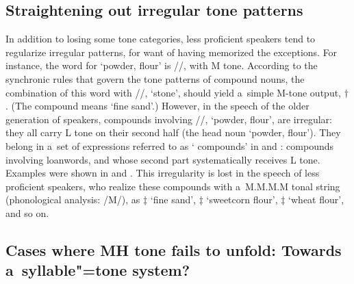 \subsection{Straightening out irregular tone patterns}
\label{sec:thestraighteningoutofirregulartonepatterns}

In addition to losing some tone categories, less proficient speakers tend to regularize irregular
patterns, for want of having memorized the exceptions. For instance, the word for ‘powder, flour’ is
//, with M tone. According to the synchronic rules that govern the tone patterns of compound nouns,
the combination of this word with //, ‘stone’, should yield a~simple M-tone output,
$\dagger$. (The compound means ‘fine sand’.) However, in the speech of the older generation of
speakers, compounds involving //,
‘powder, flour’, are irregular: they all carry L tone on their second half (the head noun ‘powder, flour’). They belong in a~set of expressions referred to as ‘ compounds' in  and : compounds involving  loanwords, and whose second part systematically receives L tone. Examples were shown in  and . This irregularity is lost in the speech of less proficient speakers, who realize these compounds with a~M.M.M.M tonal string
(phonological analysis: /M/), as $\ddagger${\kern2pt} ‘fine sand’,
$\ddagger${\kern2pt} ‘sweetcorn flour’, $\ddagger${\kern2pt} ‘wheat flour’, and so on.


\subsection{Cases where MH tone fails to unfold: Towards a~syllable"=tone system?}
\label{sec:caseswheremhtonefailstosplitintotwolevelshintofapotentialforevolutiontowardsasyllabletonesystem}

